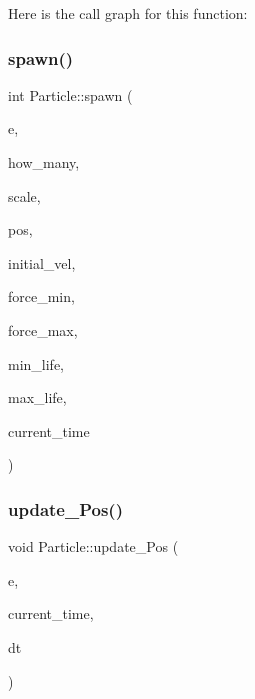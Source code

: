 Here is the call graph for this function\+:
\mbox{\label{namespace_particle_a103065e1716a2f7c3667cba5df9ebb0e}} 
\subsubsection{\texorpdfstring{spawn()}{spawn()}}
{\footnotesize\ttfamily int Particle\+::spawn (\begin{DoxyParamCaption}\item[{\mbox{\hyperlink{struct_particle_1_1_emitter}{Emitter}} $\ast$}]{e,  }\item[{int}]{how\+\_\+many,  }\item[{float}]{scale,  }\item[{const \mbox{\hyperlink{struct_vec2_d_1_1_vec2_d}{Vec2\+D\+::\+Vec2D}} $\ast$}]{pos,  }\item[{const \mbox{\hyperlink{struct_vec2_d_1_1_vec2_d}{Vec2\+D\+::\+Vec2D}} $\ast$}]{initial\+\_\+vel,  }\item[{const \mbox{\hyperlink{struct_vec2_d_1_1_vec2_d}{Vec2\+D\+::\+Vec2D}} $\ast$}]{force\+\_\+min,  }\item[{const \mbox{\hyperlink{struct_vec2_d_1_1_vec2_d}{Vec2\+D\+::\+Vec2D}} $\ast$}]{force\+\_\+max,  }\item[{int}]{min\+\_\+life,  }\item[{int}]{max\+\_\+life,  }\item[{unsigned int}]{current\+\_\+time }\end{DoxyParamCaption})}

\mbox{\label{namespace_particle_adb11ca202f3946f0bd5def1590db3e49}} 
\subsubsection{\texorpdfstring{update\+\_\+\+Pos()}{update\_Pos()}}
{\footnotesize\ttfamily void Particle\+::update\+\_\+\+Pos (\begin{DoxyParamCaption}\item[{\mbox{\hyperlink{struct_particle_1_1_emitter}{Emitter}} $\ast$}]{e,  }\item[{unsigned int}]{current\+\_\+time,  }\item[{float}]{dt }\end{DoxyParamCaption})}

